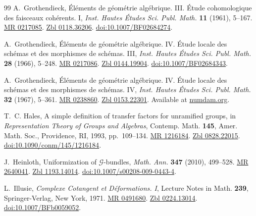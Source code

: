 \documentclass[12pt,a4paper,oneside,english,leqno]{smfart}
\numberwithin{equation}{subsection}
\numberwithin{theo}{subsection}
\theoremstyle{plain}
\theoremstyle{definition}
\theoremstyle{remark}
\begin{document}
\begin{thebibliography}{99}
 A.~Grothendieck, \'El\'ements de g\'eom\'etrie alg\'ebrique. III. \'Etude cohomologique des faisceaux coh\'erents. I, \emph{Inst. Hautes \'Etudes Sci. Publ. Math.} \textbf{11} (1961), 5--167. \href{https://mathscinet.ams.org/mathscinet-getitem?mr=0217085}{MR 0217085}. \href{https://zbmath.org/?q=an:0118.36206}{Zbl 0118.36206}. \href{https://doi.org/10.1007/BF02684274}{doi:10.1007/BF02684274}.

 A.~Grothendieck, \'El\'ements de g\'eom\'etrie alg\'ebrique. IV. \'Etude locale des sch\'emas et des morphismes de sch\'emas. III, \emph{Inst. Hautes \'Etudes Sci. Publ. Math.} \textbf{28} (1966), 5--248. \href{https://mathscinet.ams.org/mathscinet-getitem?mr=0217086}{MR 0217086}. \href{https://zbmath.org/?q=an:0144.19904}{Zbl 0144.19904}. \href{https://doi.org/10.1007/BF02684343}{doi:10.1007/BF02684343}.

 A.~Grothendieck, \'El\'ements de g\'eom\'etrie alg\'ebrique. IV. \'Etude locale des sch\'emas et des morphismes de sch\'emas. IV, \emph{Inst. Hautes \'Etudes Sci. Publ. Math.} \textbf{32} (1967), 5--361. \href{https://mathscinet.ams.org/mathscinet-getitem?mr=0238860}{MR 0238860}. \href{https://zbmath.org/?q=an:0153.22301}{Zbl 0153.22301}. Available at \href{http://www.numdam.org/item?id=PMIHES_1967__32__5_0}{numdam.org}.

 T.~C. Hales, A simple definition of transfer factors for unramified groups, in \emph{Representation Theory of Groups and Algebras}, Contemp. Math. \textbf{145}, Amer. Math. Soc., Providence, RI, 1993, pp.~109--134. \href{https://mathscinet.ams.org/mathscinet-getitem?mr=1216184}{MR 1216184}. \href{https://zbmath.org/?q=an:0828.22015}{Zbl 0828.22015}. \href{https://doi.org/10.1090/conm/145/1216184}{doi:10.1090/conm/145/1216184}.

 J.~Heinloth, Uniformization of $\mathcal{G}$-bundles, \emph{Math. Ann.} \textbf{347} (2010), 499--528. \href{https://mathscinet.ams.org/mathscinet-getitem?mr=2640041}{MR 2640041}. \href{https://zbmath.org/?q=an:1193.14014}{Zbl 1193.14014}. \href{https://doi.org/10.1007/s00208-009-0443-4}{doi:10.1007/s00208-009-0443-4}.

 L.~Illusie, \emph{Complexe Cotangent et D\'eformations. I}, Lecture Notes in Math. \textbf{239}, Springer-Verlag, New York, 1971. \href{https://mathscinet.ams.org/mathscinet-getitem?mr=0491680}{MR 0491680}. \href{https://zbmath.org/?q=an:0224.13014}{Zbl 0224.13014}. \href{https://doi.org/10.1007/BFb0059052}{doi:10.1007/BFb0059052}.


\end{thebibliography}
\end{document}
